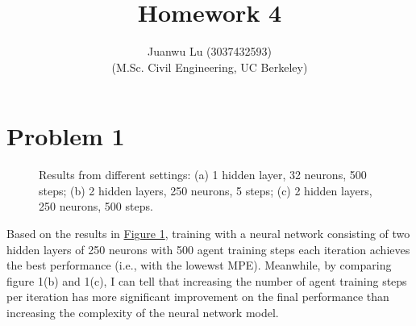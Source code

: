 \documentclass[10pt, letterpaper]{article}
\title{%
    \textbf{Homework 4}
}
\author{Juanwu Lu (3037432593)\\ \small(M.Sc. Civil Engineering, UC Berkeley)}
\date{}
\begin{document}
\maketitle
{}
\thispagestyle{fancy}
\pagestyle{plain}

\section*{Problem 1}

\begin{figure}[thbp]
    \caption{Results from different settings: (a) 1 hidden layer, 32 neurons, 500 steps; (b) 2 hidden layers, 250 neurons, 5 steps; (c) 2 hidden layers, 250 neurons, 500 steps.}
    \label{fig:1}
\end{figure}

Based on the results in \hyperref[fig:1]{Figure 1}, training with a neural network consisting of two hidden layers of 250 neurons with 500 agent training steps each iteration achieves the best performance (i.e., with the lowewst MPE). Meanwhile, by comparing figure 1(b) and 1(c), I can tell that increasing the number of agent training steps per iteration has more significant improvement on the final performance than increasing the complexity of the neural network model.
\end{document}
